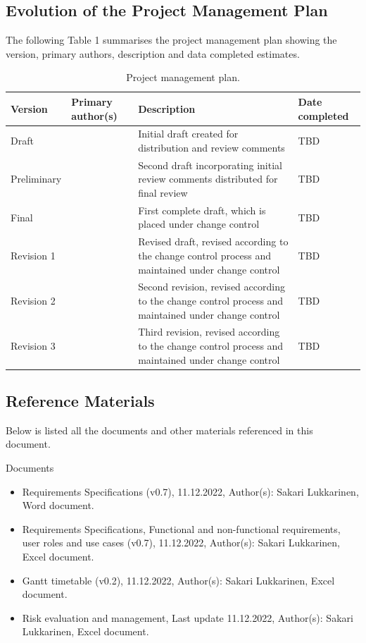 \documentclass{article}
\begin{document}
\subsection{Evolution of the Project Management Plan}
The following Table 1 summarises the project management plan showing the
version, primary authors, description and data completed estimates.

\begin{table}[h]
\centering
\caption{Project management plan.}
\label{tab:project_management_plan}
\begin{tabular}{|l|p{2cm}|p{7cm}|p{2cm}|}
\hline
\textbf{Version} & \textbf{Primary author(s)} & \textbf{Description} & \textbf{Date completed} \\
\hline
Draft & & Initial draft created for distribution and review comments & TBD \\
\hline
Preliminary & & Second draft incorporating initial review comments distributed for final review & TBD \\
\hline
Final & & First complete draft, which is placed under change control & TBD \\
\hline
Revision 1 & & Revised draft, revised according to the change control process and maintained under change control & TBD \\
\hline
Revision 2 & & Second revision, revised according to the change control process and maintained under change control & TBD \\
\hline
Revision 3 & & Third revision, revised according to the change control process and maintained under change control & TBD \\
\hline
\end{tabular}
\end{table}

\subsection{Reference Materials}
Below is listed all the documents and other materials referenced in this document.

Documents
\begin{itemize}
\item Requirements Specifications (v0.7), 11.12.2022, Author(s): Sakari Lukkarinen, Word document.
\item Requirements Specifications, Functional and non-functional requirements, user roles and use cases (v0.7), 11.12.2022, Author(s): Sakari Lukkarinen, Excel document.
\item Gantt timetable (v0.2), 11.12.2022, Author(s): Sakari Lukkarinen, Excel document.
\item Risk evaluation and management, Last update 11.12.2022, Author(s): Sakari Lukkarinen, Excel document.
\end{itemize}
\end{document}
